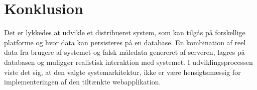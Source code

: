 \chapter{Konklusion}
Det er lykkedes at udvikle et distribueret system, som kan tilgås på forskellige platforme og hvor data kan persisteres på en database. En kombination af reel data fra brugere af systemet og falsk måledata genereret af serveren, lagres på databasen og muliggør realistisk interaktion med systemet. I udviklingsprocessen viste det sig, at den valgte systemarkitektur, ikke er være hensigtsmæssig for implementeringen af den tiltænkte webapplikation.

%
%
%
%
%
%
